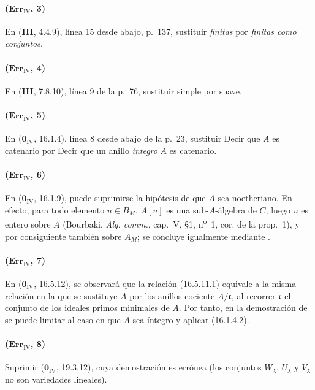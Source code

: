 \paragraph{($\mathbf{Err}_{\mathrm{IV}}$, 3)}
En (\textbf{III}, 4.4.9), línea 15 desde abajo, p.~137, sustituir \emph{finitas} por
\emph{finitas como conjuntos}.

\paragraph{($\mathbf{Err}_{\mathrm{IV}}$, 4)}
En (\textbf{III}, 7.8.10), línea 9 de la p.~76, sustituir simple por suave.

\paragraph{($\mathbf{Err}_{\mathrm{IV}}$, 5)}
En ($\mathbf{0}_{\mathrm{IV}}$, 16.1.4), línea 8 desde abajo de la p.~23, sustituir
Decir que $A$ es catenario por Decir que un anillo \emph{íntegro} $A$ es catenario.

\paragraph{($\mathbf{Err}_{\mathrm{IV}}$, 6)}
En ($\mathbf{0}_{\mathrm{IV}}$, 16.1.9), puede suprimirse la hipótesis de que
$A$ sea noetheriano. En efecto, para todo elemento $u\in B_M$, $A[u]$
es una sub-$A$-álgebra de $C$, luego $u$ es entero sobre $A$ (Bourbaki,
\emph{Alg. comm.}, cap.~V, \S1, n\textsuperscript{o}~1, cor. de la
prop.~1), y por consiguiente también sobre $A_M$; se concluye igualmente mediante
{}.

\paragraph{($\mathbf{Err}_{\mathrm{IV}}$, 7)}
En ($\mathbf{0}_{\mathrm{IV}}$, 16.5.12), se observará que la relación
(16.5.11.1) equivale a la misma relación en la que se sustituye $A$ por los
anillos cociente $A/\mathfrak r$, al recorrer $\mathfrak r$ el conjunto
de los ideales primos minimales de $A$. Por tanto, en la demostración de
{} se puede limitar al caso
en que $A$ sea íntegro y aplicar (16.1.4.2).

\paragraph{($\mathbf{Err}_{\mathrm{IV}}$, 8)}
Suprimir ($\mathbf{0}_{\mathrm{IV}}$, 19.3.12), cuya demostración es errónea
(los conjuntos $W_\lambda$, $U_\lambda$ y $V_\lambda$ no son
variedades lineales).

